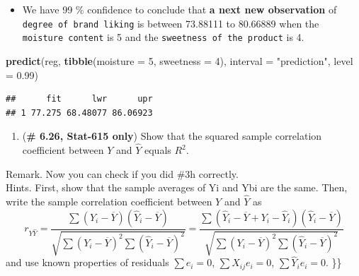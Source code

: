 \documentclass[
]{article}
\newenvironment{Shaded}{\begin{snugshade}}{\end{snugshade}}
\newcommand{\DataTypeTok}[1]{\textcolor[rgb]{0.13,0.29,0.53}{#1}}
\newcommand{\DecValTok}[1]{\textcolor[rgb]{0.00,0.00,0.81}{#1}}
\newcommand{\FloatTok}[1]{\textcolor[rgb]{0.00,0.00,0.81}{#1}}
\newcommand{\KeywordTok}[1]{\textcolor[rgb]{0.13,0.29,0.53}{\textbf{#1}}}
\newcommand{\NormalTok}[1]{#1}
\newcommand{\StringTok}[1]{\textcolor[rgb]{0.31,0.60,0.02}{#1}}
\providecommand{\tightlist}{%
  \setlength{\itemsep}{0pt}\setlength{\parskip}{0pt}}
\begin{document}
\begin{itemize}
\tightlist
\item
  We have 99 \% confidence to conclude that \textbf{a next new
  observation } of \texttt{degree\ of\ brand\ liking} is between
  73.88111 to 80.66889 when the \texttt{moisture\ content} is 5 and the
  \texttt{sweetness\ of\ the\ product} is 4.
\end{itemize}

\begin{Shaded}
\begin{Highlighting}[]
\KeywordTok{predict}\NormalTok{(reg, }\KeywordTok{tibble}\NormalTok{(}\DataTypeTok{moisture =} \DecValTok{5}\NormalTok{, }\DataTypeTok{sweetness =} \DecValTok{4}\NormalTok{), }\DataTypeTok{interval =} \StringTok{"prediction"}\NormalTok{, }\DataTypeTok{level =} \FloatTok{0.99}\NormalTok{)}
\end{Highlighting}
\end{Shaded}

\begin{verbatim}
##      fit      lwr      upr
## 1 77.275 68.48077 86.06923
\end{verbatim}

\begin{enumerate}
\def\labelenumi{\arabic{enumi}.}
\setcounter{enumi}{4}
\tightlist
\item
  (\textbf{\# 6.26, Stat-615 only}) Show that the squared sample
  correlation coefficient between \(Y\) and \(\hat Y\) equals \(R^2\).
\end{enumerate}

Remark. Now you can check if you did \#3h correctly.\\
Hints. First, show that the sample averages of Yi and Ybi are the same.
Then, write the sample correlation coefficient between \(Y\) and
\(\hat Y\) as \[
 r_{Y\widehat{Y}} = \frac{\sum
 (Y_i-\overline{Y})(\widehat{Y}_i-\overline{Y})}{\sqrt{\sum
 (Y_i-\overline{Y})^2\sum(\widehat{Y}_i-\overline{Y})^2}}
 = \frac{\sum
 (\widehat{Y}_i-\overline{Y}+Y_i-\widehat{Y}_i)(\widehat{Y}_i-\overline{Y})}{\sqrt{\sum
 (Y_i-\overline{Y})^2\sum(\widehat{Y}_i-\overline{Y})^2}}
 \] and use known properties of residuals \(\sum e_i=0\),
\(\sum X_{ij} e_i=0\), \(\sum \widehat{Y}_i e_i=0\). \}\}
\end{document}
